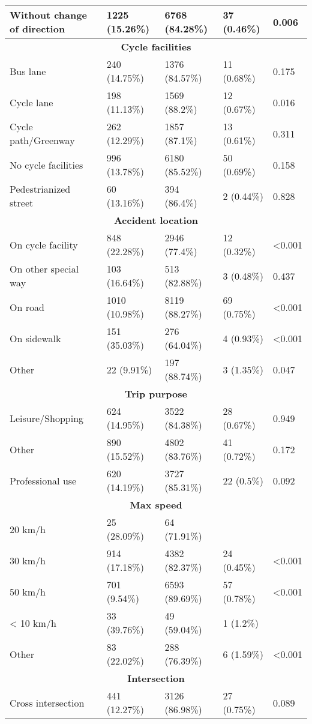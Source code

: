 \begin{longtable}{p{4.5cm}p{3cm}p{3cm}p{3cm}p{1.5cm}}
Without change of direction & 1225 (15.26\%) & 6768 (84.28\%) & 37 (0.46\%) & 0.006  \\
\hline
\multicolumn{5}{c}{\textbf{Cycle facilities}} \\
Bus lane & 240 (14.75\%) & 1376 (84.57\%) & 11 (0.68\%) & 0.175  \\
Cycle lane & 198 (11.13\%) & 1569 (88.2\%) & 12 (0.67\%) & 0.016  \\
Cycle path/Greenway & 262 (12.29\%) & 1857 (87.1\%) & 13 (0.61\%) & 0.311  \\
No cycle facilities & 996 (13.78\%) & 6180 (85.52\%) & 50 (0.69\%) & 0.158  \\
Pedestrianized street & 60 (13.16\%) & 394 (86.4\%) & 2 (0.44\%) & 0.828  \\
\hline
\multicolumn{5}{c}{\textbf{Accident location}} \\
On cycle facility & 848 (22.28\%) & 2946 (77.4\%) & 12 (0.32\%) & <0.001  \\
On other special way & 103 (16.64\%) & 513 (82.88\%) & 3 (0.48\%) & 0.437  \\
On road & 1010 (10.98\%) & 8119 (88.27\%) & 69 (0.75\%) & <0.001  \\
On sidewalk & 151 (35.03\%) & 276 (64.04\%) & 4 (0.93\%) & <0.001  \\
Other & 22 (9.91\%) & 197 (88.74\%) & 3 (1.35\%) & 0.047  \\
\hline
\multicolumn{5}{c}{\textbf{Trip purpose}} \\
Leisure/Shopping & 624 (14.95\%) & 3522 (84.38\%) & 28 (0.67\%) & 0.949  \\
Other & 890 (15.52\%) & 4802 (83.76\%) & 41 (0.72\%) & 0.172  \\
Professional use & 620 (14.19\%) & 3727 (85.31\%) & 22 (0.5\%) & 0.092  \\
\hline
\multicolumn{5}{c}{\textbf{Max speed}} \\
20 km/h & 25 (28.09\%) & 64 (71.91\%) &  &   \\
30 km/h & 914 (17.18\%) & 4382 (82.37\%) & 24 (0.45\%) & <0.001  \\
50 km/h & 701 (9.54\%) & 6593 (89.69\%) & 57 (0.78\%) & <0.001  \\
< 10 km/h & 33 (39.76\%) & 49 (59.04\%) & 1 (1.2\%) &   \\
Other & 83 (22.02\%) & 288 (76.39\%) & 6 (1.59\%) & <0.001  \\
\hline
\multicolumn{5}{c}{\textbf{Intersection}} \\
Cross intersection & 441 (12.27\%) & 3126 (86.98\%) & 27 (0.75\%) & 0.089  \\

\end{longtable}
